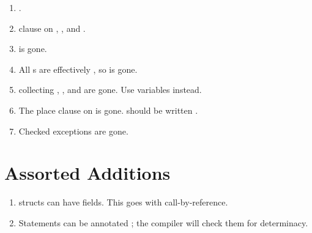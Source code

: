 \begin{enumerate}
\item {}.
\item {} clause on , , and .
\item {} is gone.
\item All s are effectively , so  is gone.
\item collecting , , and  are gone.  Use
       variables instead.
\item The place clause on  is gone.   should be
      written .
\item Checked exceptions are gone.
\end{enumerate}


\section{Assorted Additions}


\begin{enumerate}



\item structs can have  fields.  This goes with call-by-reference. 

\item Statements can be annotated ; the compiler will check them for
      determinacy. 



\end{enumerate}
